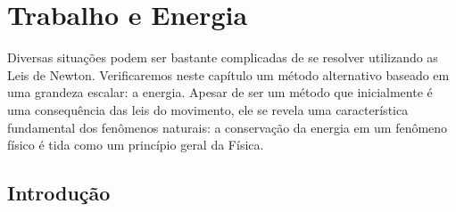 \chapter{Trabalho e Energia}
\label{Chap:Energia}





\begin{fullwidth}
{\it

Diversas situações podem ser bastante complicadas de se resolver utilizando as Leis de Newton. Verificaremos neste capítulo um método alternativo baseado em uma grandeza escalar: a energia. Apesar de ser um método que inicialmente é uma consequência das leis do movimento, ele se revela uma característica fundamental dos fenômenos naturais: a conservação da energia em um fenômeno físico é tida como um princípio geral da Física.

}
\end{fullwidth}

\section{Introdução} 

